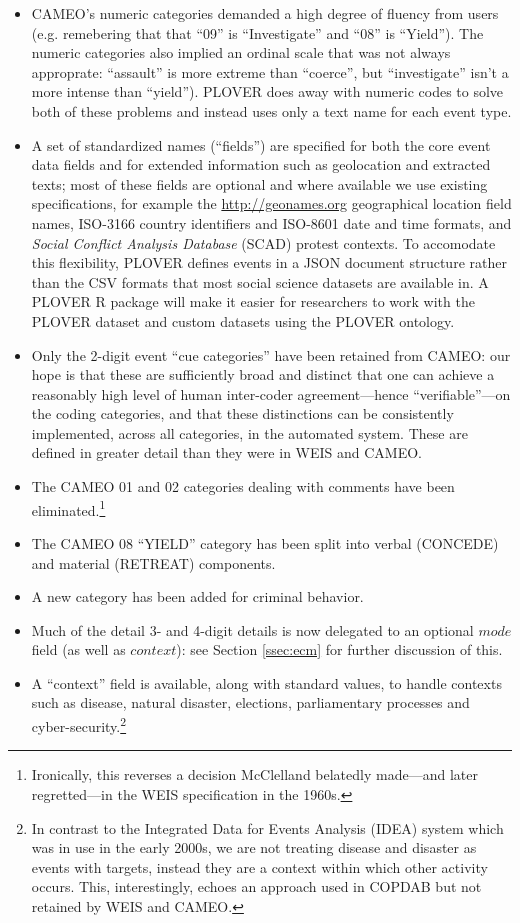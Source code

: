 \documentclass[11pt]{report}
\newcommand{\plcat}[1]{\textsf{#1}}
\newcommand{\fn}[1]{\footnote{#1}}
\begin{document}
\begin{itemize}
\item CAMEO's numeric categories demanded a high degree of fluency from users (e.g. remebering that that ``09'' is ``Investigate'' and ``08'' is ``Yield''). The numeric categories also implied an ordinal scale that was not always approprate: ``assault'' is more extreme than ``coerce'', but ``investigate'' isn't a more intense than ``yield''). PLOVER does away with numeric codes to solve both of these problems and instead uses only a text name for each event type.
\item A set of standardized names (``fields'') are specified for both the core event data fields and for extended information such as geolocation and extracted texts; most of these fields are optional and where available we use existing specifications, for example the \url{http://geonames.org} geographical location field names, ISO-3166 country identifiers and ISO-8601 date and time formats, and \textit{Social Conflict Analysis Database} (SCAD) protest contexts. To accomodate this flexibility, PLOVER defines events in a JSON document structure rather than the CSV formats that most social science datasets are available in. A PLOVER R package will make it easier for researchers to work with the PLOVER dataset and custom datasets using the PLOVER ontology.
\item Only the 2-digit event ``cue categories'' have been retained from CAMEO: our hope is that these are sufficiently broad and distinct that one can achieve a reasonably high level of human inter-coder agreement---hence ``verifiable''---on the coding categories, and that these distinctions can be consistently implemented, across all categories, in the automated system. These are defined in greater detail than they were in WEIS and CAMEO.
\item The CAMEO 01 and 02 categories dealing with comments have been eliminated.\fn{Ironically, this reverses a decision McClelland belatedly made---and later regretted---in the WEIS specification in the 1960s.}
\item The CAMEO 08 ``YIELD'' category has been split into verbal (\plcat{CONCEDE}) and material (\plcat{RETREAT}) components. 
\item A new category has been added for criminal behavior.
\item Much of the detail 3- and 4-digit details is now delegated to an optional $mode$ field (as well as $context$): see Section \ref{ssec:ecm} for further discussion of this.  \item A ``context'' field is available, along with standard values, to handle contexts such as disease, natural disaster, elections, parliamentary processes and cyber-security.\fn{In contrast to the Integrated Data for Events Analysis (IDEA) \cite{BBOJT03} system which was in use in the early 2000s, we are not treating disease and disaster as events with targets, instead they are a context within which other activity occurs. This, interestingly, echoes an approach used in COPDAB but not retained by WEIS and CAMEO.}

\end{itemize}
\end{document}

